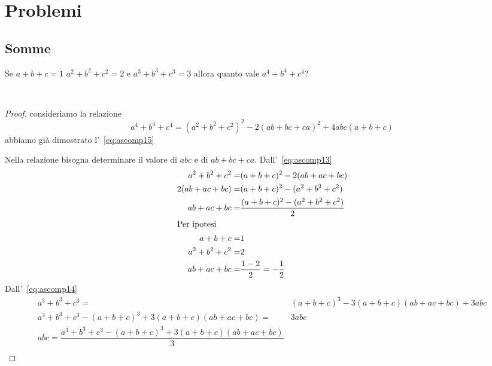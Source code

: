 \chapter{Problemi}
\section{Somme}
\begin{prob}
Se $a+b+c=1$ $a^2+b^2+c^2=2$ e $a^3+b^3+c^3=3$ allora quanto vale $a^4+b^4+c^4$?
\end{prob}~\cite{Gregorio2021}
\begin{proof}
consideriamo la relazione \[a^4+b^4+c^4=(a^2+b^2+c^2)^2-2(ab+bc+ca)^2+4abc(a+b+c)\] abbiamo già dimostrato l'~\vref{eq:ascomp15}

Nella relazione bisogna determinare il valore di $abc$ e di $ab+bc+ca$.
Dall'~\vref{eq:ascomp13}
\begin{align*}
a^2+b^2+c^2=&(a+b+c)^2-2(ab+ac+bc)\\
2(ab+ac+bc)=&(a+b+c)^2-(a^2+b^2+c^2)\\
ab+ac+bc=&\dfrac{(a+b+c)^2-(a^2+b^2+c^2)}{2}\\
\intertext{Per ipotesi}
a+b+c=&1\\
a^2+b^2+c^2=&2\\
ab+ac+bc=&\dfrac{1-2}{2}=-\dfrac{1}{2}\\
\end{align*}
Dall'~\vref{eq:ascomp14}
\begin{align*}
	a^3+b^3+c^3=&{}(a+b+c)^3-3(a+b+c)(ab+ac+bc)+3abc\\
	a^3+b^3+c^3-(a+b+c)^3+3(a+b+c)(ab+ac+bc)=&3abc\\
	abc=	\dfrac{a^3+b^3+c^3-(a+b+c)^3+3(a+b+c)(ab+ac+bc)}{3}\\
\end{align*}
\end{proof}